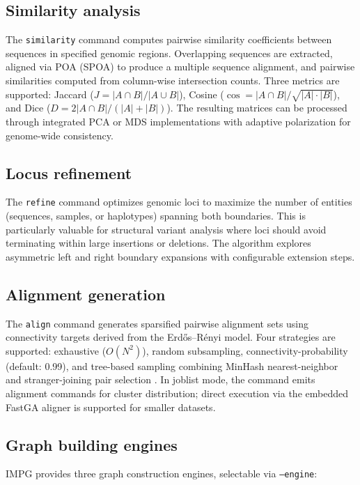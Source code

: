 \subsection*{Similarity analysis}

The \texttt{similarity} command computes pairwise similarity coefficients between sequences in specified genomic regions. Overlapping sequences are extracted, aligned via POA (SPOA) to produce a multiple sequence alignment, and pairwise similarities computed from column-wise intersection counts. Three metrics are supported: Jaccard ($J = |A \cap B| / |A \cup B|$), Cosine ($\cos = |A \cap B| / \sqrt{|A| \cdot |B|}$), and Dice ($D = 2|A \cap B| / (|A| + |B|)$). The resulting matrices can be processed through integrated PCA or MDS implementations with adaptive polarization for genome-wide consistency.

\subsection*{Locus refinement}

The \texttt{refine} command optimizes genomic loci to maximize the number of entities (sequences, samples, or haplotypes) spanning both boundaries. This is particularly valuable for structural variant analysis where loci should avoid terminating within large insertions or deletions. The algorithm explores asymmetric left and right boundary expansions with configurable extension steps.

\subsection*{Alignment generation}

The \texttt{align} command generates sparsified pairwise alignment sets using connectivity targets derived from the Erd\H{o}s--R\'enyi model. Four strategies are supported: exhaustive ($O(N^2)$), random subsampling, connectivity-probability (default: 0.99), and tree-based sampling combining MinHash nearest-neighbor and stranger-joining pair selection \cite{sweepga}. In joblist mode, the command emits alignment commands for cluster distribution; direct execution via the embedded FastGA aligner is supported for smaller datasets.

\subsection*{Graph building engines}

IMPG provides three graph construction engines, selectable via \texttt{--engine}:

